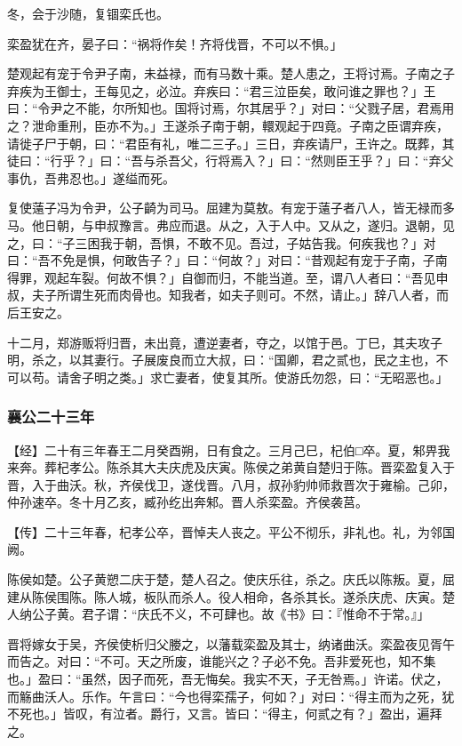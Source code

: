 \documentclass[]{article}
\begin{document}
冬，会于沙随，复锢栾氏也。

栾盈犹在齐，晏子曰：``祸将作矣！齐将伐晋，不可以不惧。」

楚观起有宠于令尹子南，未益禄，而有马数十乘。楚人患之，王将讨焉。子南之子弃疾为王御士，王每见之，必泣。弃疾曰：``君三泣臣矣，敢问谁之罪也？」王曰：``令尹之不能，尔所知也。国将讨焉，尔其居乎？」对曰：``父戮子居，君焉用之？泄命重刑，臣亦不为。」王遂杀子南于朝，轘观起于四竟。子南之臣谓弃疾，请徙子尸于朝，曰：``君臣有礼，唯二三子。」三日，弃疾请尸，王许之。既葬，其徒曰：``行乎？」曰：``吾与杀吾父，行将焉入？」曰：``然则臣王乎？」曰：``弃父事仇，吾弗忍也。」遂缢而死。

复使薳子冯为令尹，公子齮为司马。屈建为莫敖。有宠于薳子者八人，皆无禄而多马。他日朝，与申叔豫言。弗应而退。从之，入于人中。又从之，遂归。退朝，见之，曰：``子三困我于朝，吾惧，不敢不见。吾过，子姑告我。何疾我也？」对曰：``吾不免是惧，何敢告子？」曰：``何故？」对曰：``昔观起有宠于子南，子南得罪，观起车裂。何故不惧？」自御而归，不能当道。至，谓八人者曰：``吾见申叔，夫子所谓生死而肉骨也。知我者，如夫子则可。不然，请止。」辞八人者，而后王安之。

十二月，郑游贩将归晋，未出竟，遭逆妻者，夺之，以馆于邑。丁巳，其夫攻子明，杀之，以其妻行。子展废良而立大叔，曰：``国卿，君之贰也，民之主也，不可以苟。请舍子明之类。」求亡妻者，使复其所。使游氏勿怨，曰：``无昭恶也。」

\hypertarget{header-n2135}{%
\subsubsection{襄公二十三年}\label{header-n2135}}

【经】二十有三年春王二月癸酉朔，日有食之。三月己巳，杞伯□卒。夏，邾畀我来奔。葬杞孝公。陈杀其大夫庆虎及庆寅。陈侯之弟黄自楚归于陈。晋栾盈复入于晋，入于曲沃。秋，齐侯伐卫，遂伐晋。八月，叔孙豹帅师救晋次于雍榆。己卯，仲孙速卒。冬十月乙亥，臧孙纥出奔邾。晋人杀栾盈。齐侯袭莒。

【传】二十三年春，杞孝公卒，晋悼夫人丧之。平公不彻乐，非礼也。礼，为邻国阙。

陈侯如楚。公子黄愬二庆于楚，楚人召之。使庆乐往，杀之。庆氏以陈叛。夏，屈建从陈侯围陈。陈人城，板队而杀人。役人相命，各杀其长。遂杀庆虎、庆寅。楚人纳公子黄。君子谓：``庆氏不义，不可肆也。故《书》曰：『惟命不于常。』」

晋将嫁女于吴，齐侯使析归父媵之，以藩载栾盈及其士，纳诸曲沃。栾盈夜见胥午而告之。对曰：``不可。天之所废，谁能兴之？子必不免。吾非爱死也，知不集也。」盈曰：``虽然，因子而死，吾无悔矣。我实不天，子无咎焉。」许诺。伏之，而觞曲沃人。乐作。午言曰：``今也得栾孺子，何如？」对曰：``得主而为之死，犹不死也。」皆叹，有泣者。爵行，又言。皆曰：``得主，何贰之有？」盈出，遍拜之。
\end{document}
